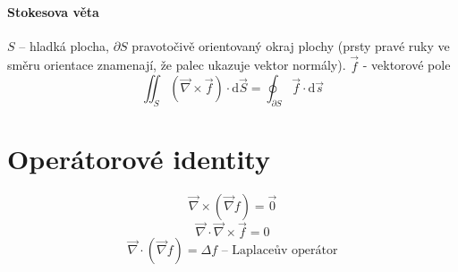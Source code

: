 \documentclass[a4paper, twoside,%
12pt]{article}
\newcommand{\dif}{\mathrm{d}}
\begin{document}
\paragraph{Stokesova věta} $S$ -- hladká plocha, $\partial S$ pravotočivě orientovaný okraj plochy (prsty pravé ruky ve směru orientace znamenají, že palec ukazuje vektor normály). $\vec f$ - vektorové pole
$$\iint_S (\vec{\nabla}\times \vec{f}) \cdot \dif\vec S = \oint_{\partial S} \vec{f}\cdot \dif \vec{s} $$

\section*{Operátorové identity}

$$  \vec{\nabla}\times( \vec\nabla {f}) = \vec 0 $$
$$ \vec\nabla \cdot \vec{\nabla}\times \vec{f} = 0 $$
$$  \vec{\nabla}\cdot( \vec\nabla {f}) = \Delta f \text{ -- Laplaceův operátor} $$
\end{document}
